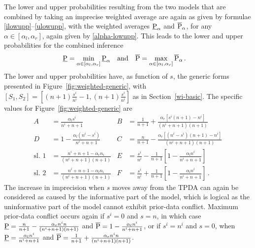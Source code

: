 The lower and upper probabilities resulting from the two models that
are combined by taking an imprecise weighted average are again as
given by formulae \eqref{ilowupp}--\eqref{ulowupp}, with the weighted
averages $\underline{\operatorname{P}}_{\alpha}$ and $\overline{\operatorname{P}}_{\alpha}$, for any
$\alpha \in [\alpha_l,\alpha_r]$, again given by %
\eqref{alpha-lowupp}. This leads to the lower and
upper probabilities for the combined inference
\begin{align*}
\Pl &= \min_{\alpha \in [\alpha_l,\alpha_r]} \Pl_{\alpha} & \text{and}& & %
\Pu &= \max_{\alpha \in [\alpha_l,\alpha_r]} \Pu_{\alpha} \,.             %
\end{align*}
The lower and upper probabilities have, as function of $s$,
the generic forms presented in Figure~\ref{fig:weighted-generic},
with
$[S_1,S_2]=\left[(n+1)\frac{s^i}{n^i}-1, (n+1)\frac{s^i}{n^i}\right]$ as in Section~\ref{wi-basic}.
The specific values for Figure~\ref{fig:weighted-generic} are
\begin{align*}
A &= \textstyle \frac{\alpha_l s^i}{n^i+n+1} &
B &= \textstyle \frac{1}{n+1} + \frac{\alpha_r [s^i(n+1)-n^i]}{(n^i+n+1)(n+1)} \\
D &= \textstyle 1-\frac{\alpha_l(n^i-s^i)}{n^i+n+1} &
C &= \textstyle \frac{n}{n+1}-\frac{\alpha_r[(n^i-s^i)(n+1)-n^i]}{(n^i+n+1)(n+1)} \\
\text{sl.~1} &= \textstyle \frac{n^i+n+1-\alpha_r n_i}{(n^i+n+1)(n+1)} &
E &= \textstyle \frac{s^i}{n^i}-\frac{1}{n+1}\left[1-\frac{\alpha_l n^i}{n^i+n+1}\right] \\
\text{sl.~2} &= \textstyle \frac{n^i+n+1-\alpha_l n_i}{(n^i+n+1)(n+1)} &
F &= \textstyle \frac{s^i}{n^i}+\frac{1}{n+1}\left[1-\frac{\alpha_l n^i}{n^i+n+1}\right] \,.
\end{align*}
The increase in imprecision when $s$ moves away from the TPDA can again be
considered as caused by the informative part of the model, which is logical as the uninformative part of the model cannot
exhibit prior-data conflict.
Maximum prior-data conflict occurs again if $s^i=0$ and $s=n$, in which case
$\underline{\operatorname{P}} = \frac{n}{n+1} - \frac{\alpha_r n^i n}{(n^i+n+1)(n+1)}$ and
$\overline{\operatorname{P}} = 1 - \frac{\alpha_l n^i}{n^i+n+1}$, or if $s^i=n^i$ and $s=0$,
when $\underline{\operatorname{P}} = \frac{\alpha_l n^i}{n^i+n+1}$ and
$\overline{\operatorname{P}} = \frac{1}{n+1} + \frac{\alpha_r n^in}{(n^i+n+1)(n+1)}$.

